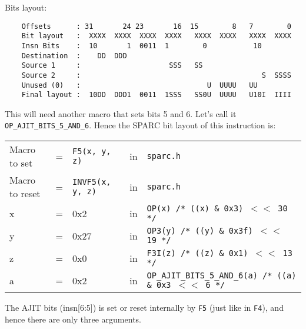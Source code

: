 \begin{enumerate}
\begin{enumerate}
    Bits layout:
\begin{verbatim}
    Offsets      : 31       24 23       16  15        8   7        0
    Bit layout   :  XXXX  XXXX  XXXX  XXXX   XXXX  XXXX   XXXX  XXXX
    Insn Bits    :  10       1  0011  1        0           10        
    Destination  :    DD  DDD                                       
    Source 1     :                     SSS   SS
    Source 2     :                                           S  SSSS
    Unused (0)   :                              U  UUUU   UU        
    Final layout :  10DD  DDD1  0011  1SSS   SS0U  UUUU   U10I  IIII
\end{verbatim}

    This will need another macro that sets bits 5 and 6. Let's call it
    \texttt{OP\_AJIT\_BITS\_5\_AND\_6}.   Hence the  SPARC bit  layout of  this
    instruction is:

    \begin{tabular}[h]{lclcl}
      Macro to set  &=& \texttt{F5(x, y, z)} &in& \texttt{sparc.h}     \\
      Macro to reset  &=& \texttt{INVF5(x, y, z)} &in& \texttt{sparc.h}     \\
      x &=& 0x2      &in& \texttt{OP(x)  /* ((x) \& 0x3)  $<<$ 30 */} \\
      y &=& 0x27     &in& \texttt{OP3(y) /* ((y) \& 0x3f) $<<$ 19 */} \\
      z &=& 0x0      &in& \texttt{F3I(z) /* ((z) \& 0x1)  $<<$ 13 */} \\
      a &=& 0x2      &in& \texttt{OP\_AJIT\_BITS\_5\_AND\_6(a) /* ((a) \& 0x3  $<<$ 6 */}
    \end{tabular}

    The AJIT bits (insn[6:5]) is  set or reset internally by \texttt{F5}
    (just  like  in  \texttt{F4}),  and   hence  there  are  only  three
    arguments.
  \end{enumerate}
\end{enumerate}
